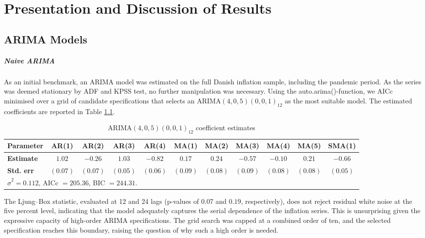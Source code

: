 \chapter{Presentation and Discussion of Results}\label{sec:results}


\section{ARIMA Models}\label{sec:arima}

\paragraph{Naive ARIMA}

As an initial benchmark, an ARIMA model was estimated on the full Danish inflation sample, including the pandemic period. As the series was deemed stationary by ADF and KPSS test, no further manipulation was necessary.  Using the auto.arima()-function, we AICc minimised over a grid of candidate specifications that selects an ARIMA$(4,0,5)(0,0,1)_{12}$ as the most suitable model. The estimated coefficients are reported in Table \ref{tab:arima_coef}. 
\begin{table}[h]
\centering
\caption{ARIMA$(4,0,5)(0,0,1)_{12}$ coefficient estimates}
\small{
\begin{tabular*}{\textwidth}{@{\extracolsep{\fill}}lcccccccccc}
\hline \hline
\rule{0pt}{12pt}\textbf{Parameter} & AR(1) & AR(2) & AR(3) & AR(4) & MA(1) & MA(2) & MA(3) & MA(4) & MA(5) & SMA(1) \\[4pt]
\hline
\rule{0pt}{12pt}\textbf{Estimate} & $1.02$ & $-0.26$ & $1.03$ & $-0.82$ & $0.17$ & $0.24$ & $-0.57$ & $-0.10$ & $0.21$ & $-0.66$ \\[4pt]
\rule{0pt}{12pt}\textbf{Std. err} & $(0.07)$ & $(0.07)$ & $(0.05)$ & $(0.06)$ & $(0.09)$ & $(0.08)$ & $(0.09)$ & $(0.08)$ & $(0.08)$ & $(0.05)$ \\ [4pt]
\hline \hline
\multicolumn{11}{l}{\rule{0pt}{12pt}\footnotesize $\hat{\sigma}^2 = 0.112$, AICc $= 205.36$, BIC $= 244.31$.}
\end{tabular*}
} 
\label{tab:arima_coef}
\end{table}
The Ljung--Box statistic, evaluated at 12 and 24 lags (p-values of $0.07$ and $0.19$, respectively), does not reject residual white noise at the five percent level, indicating that the model adequately captures the serial dependence of the inflation series. This is unsurprising given the expressive capacity of high-order ARIMA specifications. The grid search was capped at a combined order of ten, and the selected specification reaches this boundary, raising the question of why such a high order is needed.

